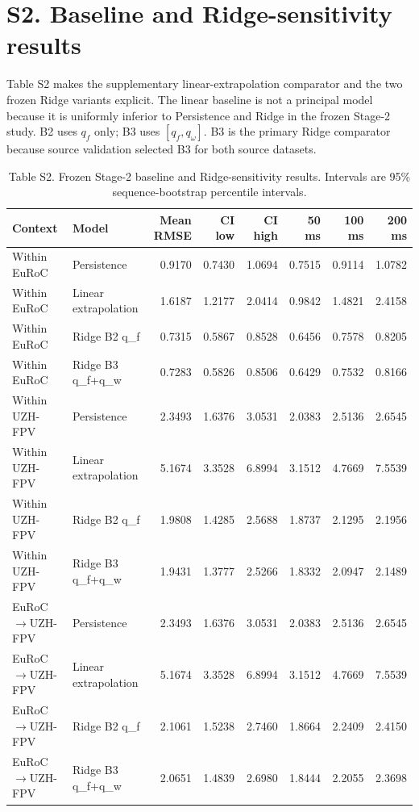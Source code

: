 \documentclass[11pt]{article}
\newcommand{\qf}{q_f}
\newcommand{\qw}{q_\omega}
\begin{document}
\section*{S2. Baseline and Ridge-sensitivity results}
Table S2 makes the supplementary linear-extrapolation comparator and the two frozen Ridge variants explicit. The linear baseline is not a principal model because it is uniformly inferior to Persistence and Ridge in the frozen Stage-2 study. B2 uses $\qf$ only; B3 uses $[\qf,\qw]$. B3 is the primary Ridge comparator because source validation selected B3 for both source datasets.
\begin{landscape}
\begin{table}[htbp]\centering
\caption*{Table S2. Frozen Stage-2 baseline and Ridge-sensitivity results. Intervals are 95\% sequence-bootstrap percentile intervals.}
\scriptsize
\begin{tabular}{llrrrrrr}
\toprule
Context & Model & Mean RMSE & CI low & CI high & 50 ms & 100 ms & 200 ms\\
\midrule
Within EuRoC & Persistence & 0.9170 & 0.7430 & 1.0694 & 0.7515 & 0.9114 & 1.0782 \\
Within EuRoC & Linear extrapolation & 1.6187 & 1.2177 & 2.0414 & 0.9842 & 1.4821 & 2.4158 \\
Within EuRoC & Ridge B2 q\_f & 0.7315 & 0.5867 & 0.8528 & 0.6456 & 0.7578 & 0.8205 \\
Within EuRoC & Ridge B3 q\_f+q\_w & 0.7283 & 0.5826 & 0.8506 & 0.6429 & 0.7532 & 0.8166 \\
Within UZH-FPV & Persistence & 2.3493 & 1.6376 & 3.0531 & 2.0383 & 2.5136 & 2.6545 \\
Within UZH-FPV & Linear extrapolation & 5.1674 & 3.3528 & 6.8994 & 3.1512 & 4.7669 & 7.5539 \\
Within UZH-FPV & Ridge B2 q\_f & 1.9808 & 1.4285 & 2.5688 & 1.8737 & 2.1295 & 2.1956 \\
Within UZH-FPV & Ridge B3 q\_f+q\_w & 1.9431 & 1.3777 & 2.5266 & 1.8332 & 2.0947 & 2.1489 \\
EuRoC$\rightarrow$UZH-FPV & Persistence & 2.3493 & 1.6376 & 3.0531 & 2.0383 & 2.5136 & 2.6545 \\
EuRoC$\rightarrow$UZH-FPV & Linear extrapolation & 5.1674 & 3.3528 & 6.8994 & 3.1512 & 4.7669 & 7.5539 \\
EuRoC$\rightarrow$UZH-FPV & Ridge B2 q\_f & 2.1061 & 1.5238 & 2.7460 & 1.8664 & 2.2409 & 2.4150 \\
EuRoC$\rightarrow$UZH-FPV & Ridge B3 q\_f+q\_w & 2.0651 & 1.4839 & 2.6980 & 1.8444 & 2.2055 & 2.3698 \\

\end{tabular}
\end{table}
\end{landscape}
\end{document}
